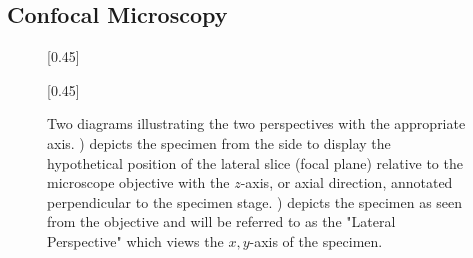 \subsection{Confocal Microscopy}\label{sec:Confocal}

\begin{figure}[h]
    \centering
    [0.45\textwidth]{%
    
    }%
    \hfill
    [0.45\textwidth]{%
    
    }%
    \caption[Two diagrams of different perspectives to view the specimen relative to the microscope objective. This is presented to show the relative position of the lateral slice (focal plane) in the specimen]{Two diagrams illustrating the two perspectives with the appropriate axis. ) depicts the specimen from the side to display the hypothetical position of the lateral slice (focal plane) relative to the microscope objective with the $z$-axis, or axial direction, annotated perpendicular to the specimen stage. ) depicts the specimen as seen from the objective and will be referred to as the "Lateral Perspective" which views the $x,y$-axis of the specimen.}
    \label{fig:micro_persp}
\end{figure}

